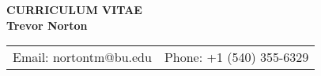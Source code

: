 
\thispagestyle{empty}

\begin{center}
	{\LARGE {\bf CURRICULUM VITAE}}\\
	\vspace{0.5in}
	{\large {\bf Trevor Norton}}
\end{center}



\begin{center}
	\begin{tabular}{l l}
		Email: nortontm@bu.edu & Phone: +1 (540) 355-6329 \\
	\end{tabular}


\vspace{0.25em}



\end{center}
